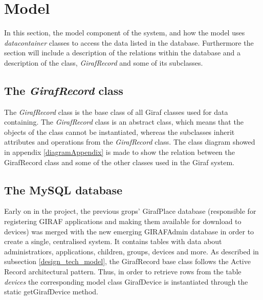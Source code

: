 \section{Model}
\label{model}

In this section, the model component of the system, and how the model uses \textit{datacontainer} classes to access the data listed in the database. Furthermore the section will include a description of the relations within the database and a description of the class, \textit{GirafRecord} and some of its subclasses.

\subsection{The \textit{GirafRecord} class}
The \textit{GirafRecord} class is the base class of all Giraf classes used for data containing. The \textit{GirafRecord} class is an abstract class, which means that the objects of the class cannot be instantiated, whereas the subclasses inherit attributes and operations from the \textit{GirafRecord} class. 
The class diagram showed in appendix \ref{diagramAppendix} is made to show the relation between the GirafRecord class and some of the other classes used in the Giraf system.

\subsection{The MySQL database}
Early on in the project, the previous grops' GirafPlace database (responsible for registering GIRAF applications and making them available for download to devices) was merged with the new emerging GIRAFAdmin database in order to create a single, centralised system. It contains tables with data about administratiors, applications, children, groups, devices and more.
As described in subsection \vref{design_tech_model}, the GirafRecord base class follows the Active Record architectural pattern. Thus, in order to retrieve rows from the table \emph{devices} the corresponding model class GirafDevice is instantiated through the static getGirafDevice method.

